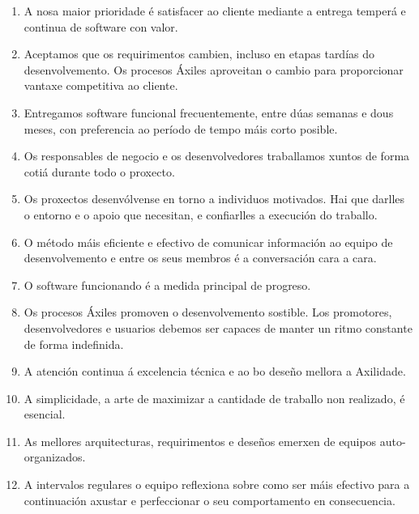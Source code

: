 \begin{enumerate}
\item A nosa maior prioridade é satisfacer ao cliente
mediante a entrega temperá e continua de software
con valor.

\item Aceptamos que os requirimentos cambien, incluso en etapas 
tardías do desenvolvemento. Os procesos Áxiles aproveitan
o cambio para proporcionar vantaxe competitiva ao 
cliente.

\item Entregamos software funcional frecuentemente, entre dúas
semanas e dous meses, con preferencia ao período de 
tempo máis corto posible.

\item Os responsables de negocio e os desenvolvedores
traballamos xuntos de forma cotiá durante todo
o proxecto.

\item Os proxectos desenvólvense en torno a individuos 
motivados. Hai que darlles o entorno e o apoio que 
necesitan, e confiarlles a execución do traballo. 

\item O método máis eficiente e efectivo de comunicar 
información ao equipo de desenvolvemento e entre os seus 
membros é a conversación cara a cara.

\item O software funcionando é a medida principal de 
progreso.

\item Os procesos Áxiles promoven o desenvolvemento 
sostible. Los promotores, desenvolvedores e usuarios
debemos ser capaces de manter un ritmo constante 
de forma indefinida.

\item A atención continua á excelencia técnica e ao 
bo deseño mellora a Axilidade.

\item A simplicidade, a arte de maximizar a cantidade de
traballo non realizado, é esencial.

\item As mellores arquitecturas, requirimentos e deseños
emerxen de equipos auto-organizados.

\item A intervalos regulares o equipo reflexiona sobre
como ser máis efectivo para a continuación axustar e
perfeccionar o seu comportamento en consecuencia.
\end{enumerate}


